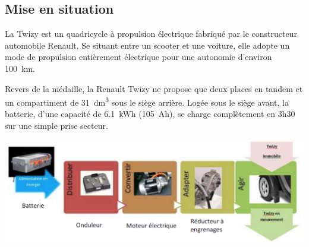 \documentclass[10pt,fleqn]{article} %
\begin{document}

\vspace{4.5cm}
\pagestyle{fancy}
\thispagestyle{plain}

\def\columnseprulecolor{\color{ocre}}
\setlength{\columnseprule}{0.4pt} 

\def\pathfig{images}

\begin{multicols}{2}
\subsection*{Mise en situation}

La Twizy est un quadricycle à propulsion
électrique fabriqué par le constructeur automobile
Renault. %
Se situant entre
un scooter et une voiture, elle adopte un mode de
propulsion entièrement électrique pour une
autonomie d'environ \SI{100}{km}. 



Revers de la médaille, la Renault Twizy ne
propose que deux places en tandem et un compartiment de \SI{31}{dm^3} sous le siège arrière.
Logée sous le siège avant, la batterie, d'une capacité de \SI{6,1}{kWh} (\SI{105}{Ah}), se charge complètement en 3h30 sur une simple prise secteur.%




\begin{center}
\includegraphics[width=\linewidth]{images/ccmp_07_bis}
\end{center}



\end{multicols}
\end{document}
